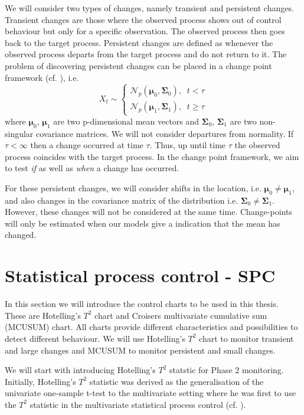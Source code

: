 We will consider two types of changes, namely transient and persistent changes. Transient changes are those where the observed process shows out of control behaviour but only for a specific observation. The observed process then goes back to the target process. Persistent changes are defined as whenever the observed process departs from the target process and do not return to it. The problem of discovering persistent changes can be placed in a change point framework (cf. \citet{CPDbook}), i.e.
\begin{equation}\label{DefCP}
X_t \sim
\begin{cases} 
\mathcal{N}_p(\boldsymbol{\mu}_0,\boldsymbol{\Sigma}_0), \;\; t<\tau \\
\mathcal{N}_p(\boldsymbol{\mu}_1,\boldsymbol{\Sigma}_1), \;\; t\geq \tau
\end{cases}
\end{equation}
where $\boldsymbol{\mu}_0$, $\boldsymbol{\mu}_1$ are two p-dimensional mean vectors and $\boldsymbol{\Sigma}_0$, $\boldsymbol{\Sigma}_1$ are two non-singular covariance matrices. We will not consider departures from normality. If $\tau<\infty$ then a change occurred at time $\tau$. Thus, up until time $\tau$ the observed process coincides with the target process. In the change point framework, we aim to test \textit{if} as well as \textit{when} a change has occurred.

For these persistent changes, we will consider shifts in the location, i.e. $\boldsymbol{\mu}_0 \neq \boldsymbol{\mu}_1$, and also changes in the covariance matrix of the distribution i.e. $\boldsymbol{\Sigma}_0 \neq \boldsymbol{\Sigma}_1$. However, these changes will not be considered at the same time. Change-points will only be estimated when our models give a indication that the mean has changed.

\section{Statistical process control - SPC}
In this section we will introduce the control charts to be used in this thesis. These are Hotelling's $T^2$ chart and Croisers multivariate cumulative sum (MCUSUM) chart. All charts provide different characteristics and possibilities to detect different behaviour. We will use Hotelling's $T^2$ chart to monitor transient and large changes and MCUSUM to monitor persistent and small changes. 

We will start with introducing Hotelling's $T^2$ statstic for Phase 2 monitoring. Initially, Hotelling's $T^2$ statistic was derived as the generalisation of the univariate one-sample t-test to the multivariate setting where he was first to use the $T^2$ statistic in the multivariate statistical process control (cf. \citet{HotellingQC}). 
